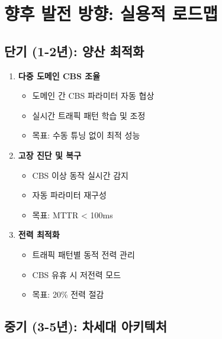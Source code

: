 \documentclass[twocolumn,10pt]{article}
\begin{document}
\section{향후 발전 방향: 실용적 로드맵}
\label{sec:future}

\subsection{단기 (1-2년): 양산 최적화}

\begin{enumerate}
    \item \textbf{다중 도메인 CBS 조율}
        \begin{itemize}
            \item 도메인 간 CBS 파라미터 자동 협상
            \item 실시간 트래픽 패턴 학습 및 조정
            \item 목표: 수동 튜닝 없이 최적 성능
        \end{itemize}
    
    \item \textbf{고장 진단 및 복구}
        \begin{itemize}
            \item CBS 이상 동작 실시간 감지
            \item 자동 파라미터 재구성
            \item 목표: MTTR < 100ms
        \end{itemize}
    
    \item \textbf{전력 최적화}
        \begin{itemize}
            \item 트래픽 패턴별 동적 전력 관리
            \item CBS 유휴 시 저전력 모드
            \item 목표: 20\% 전력 절감
        \end{itemize}
\end{enumerate}

\subsection{중기 (3-5년): 차세대 아키텍처}
\end{document}

